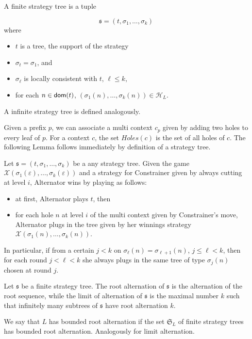 A finite strategy tree is a tuple

\[ \mathfrak{s}=(t, \sigma_1, \dots, \sigma_k) \] where
\begin{itemize}
\item $t$ is a tree, the support of the strategy
\item $\sigma_t=\sigma_1$, and
\item $\sigma_\ell$ is locally consistent with $t$, $\ell \leq k$,
\item for each $n \in \mathsf{dom}(t)$, $(\sigma_1(n), \dots, \sigma_k(n)) \in \mathcal{H}_L$.
\end{itemize}

A  infinite strategy tree is defined analogously.

Given a prefix $p$, we can associate a multi context $c_p$ given by adding two holes to every leaf of $p$. For a context $c$, the set $Holes(c)$ is the set of all holes of $c$. The following Lemma follows immediately by definition of a strategy tree.

\begin{lemma}\label{lemma:short_strategy}
Let $\mathfrak{s}=(t, \sigma_1, \dots, \sigma_k)$ be a any strategy tree. Given the  game $\mathcal{X}(\sigma_1(\varepsilon), \dots, \sigma_k(\varepsilon))$ and a strategy for Constrainer given by always cutting at level $i$, Alternator wins  by playing as follows:
\begin{itemize}
\item at first, Alternator plays $t$, then
\item for each hole $n$ at level $i$ of the multi context given by Constrainer's move, Alternator plugs in the tree given by her winnings strategy $\mathcal{X}(\sigma_1(n), \dots, \sigma_k(n))$.
\end{itemize}
In particular, if from a certain $j<k$ on $\sigma_\ell(n)=\sigma_{\ell+1}(n)$, $j\leq \ell < k$, then for each round $j< \ell < k$ she always plugs in the same tree of type $\sigma_j(n)$ chosen at round $j$.

\end{lemma}

Let $\mathfrak{s}$ be a finite strategy tree. The root alternation of $\mathfrak{s}$ is the alternation of the root sequence, while the limit of alternation of $\mathfrak{s}$ is the maximal number $k$ such that infinitely many subtrees of $\mathfrak{s}$ have root alternation $k$.

We say that $L$ has bounded root alternation if the set $\mathfrak{S}_L$ of finite strategy trees has bounded root alternation. Analogously for limit alternation.

